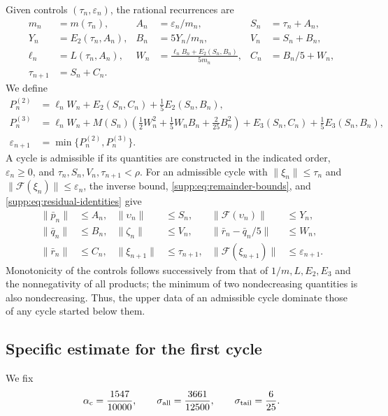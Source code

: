 \documentclass[11pt,a4paper]{article}
\numberwithin{equation}{section}
\numberwithin{table}{section}
\theoremstyle{plain}
\theoremstyle{definition}\newtheorem{definition}[theorem]{Definition}
\theoremstyle{remark}\newtheorem{remark}[theorem]{Remark}
\begin{document}
Given controls $(\tau_n,\varepsilon_n)$, the rational recurrences are
\begin{equation}
 \begin{aligned}
 m_n&=m(\tau_n),&A_n&=\varepsilon_n/m_n,&S_n&=\tau_n+A_n,\\
 Y_n&=E_2(\tau_n,A_n),&B_n&=5Y_n/m_n,&V_n&=S_n+B_n,\\
 \ell_n&=L(\tau_n,A_n),&W_n&=\frac{\ell_nB_n+E_2(S_n,B_n)}{5m_n},&
 C_n&=B_n/5+W_n,\\
 \tau_{n+1}&=S_n+C_n.&&&&
 \end{aligned}\label{supp:eq:radial-recursion}
\end{equation}
We define
\begin{equation}
 \begin{aligned}
 P_n^{(2)}&=\ell_nW_n+E_2(S_n,C_n)+\tfrac15E_2(S_n,B_n),\\
 P_n^{(3)}&=\ell_nW_n+M(S_n)\left(\tfrac12W_n^2+
  \tfrac15W_nB_n+\tfrac2{25}B_n^2\right)
  +E_3(S_n,C_n)+\tfrac15E_3(S_n,B_n),\\
 \varepsilon_{n+1}&=\min\{P_n^{(2)},P_n^{(3)}\}.
 \end{aligned}\label{supp:eq:radial-residual}
\end{equation}
A cycle is admissible if its quantities are constructed in the indicated
order, $\varepsilon_n\geq0$, and $\tau_n,S_n,V_n,\tau_{n+1}<\rho$.
For an admissible cycle with
$\|\xi_n\|\leq\tau_n$ and
$\|\mathcal F(\xi_n)\|\leq\varepsilon_n$, the inverse bound,
\eqref{supp:eq:remainder-bounds}, and
\eqref{supp:eq:residual-identities} give
\begin{equation}
\begin{aligned}
 \|\bar p_n\|&\leq A_n,& \|\upsilon_n\|&\leq S_n,&
 \|\mathcal F(\upsilon_n)\|&\leq Y_n,\\
 \|\bar q_n\|&\leq B_n,& \|\zeta_n\|&\leq V_n,&
 \|\bar r_n-\bar q_n/5\|&\leq W_n,\\
 \|\bar r_n\|&\leq C_n,& \|\xi_{n+1}\|&\leq\tau_{n+1},&
 \|\mathcal F(\xi_{n+1})\|&\leq\varepsilon_{n+1}.
\end{aligned}
\label{supp:eq:one-step-bounds}
\end{equation}
Monotonicity of the controls follows successively from that of
$1/m,L,E_2,E_3$ and the nonnegativity of all products; the minimum of
two nondecreasing quantities is also nondecreasing. Thus, the upper
data of an admissible cycle dominate those of any cycle started below
them.

\subsection{Specific estimate for the first cycle}
We fix
\[
 \alpha_{\rm c}=\frac{1547}{10000},\qquad
 \sigma_{\rm all}=\frac{3661}{12500},\qquad
 \sigma_{\rm tail}=\frac6{25}.
\]
\end{document}
